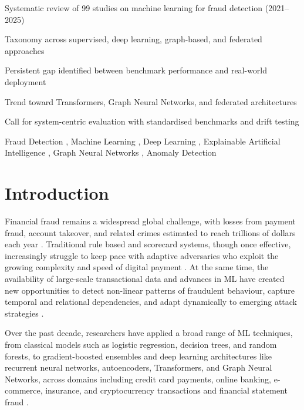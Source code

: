 \documentclass[a4paper,fleqn]{cas-dc}
\begin{document}
\begin{highlights}
\item Systematic review of 99 studies on machine learning for fraud detection (2021--2025)
\item Taxonomy across supervised, deep learning, graph-based, and federated approaches
\item Persistent gap identified between benchmark performance and real-world deployment
\item Trend toward Transformers, Graph Neural Networks, and federated architectures
\item Call for system-centric evaluation with standardised benchmarks and drift testing
\end{highlights}

\begin{keywords}
Fraud Detection \sep 
Machine Learning \sep
Deep Learning \sep
Explainable Artificial Intelligence \sep
Graph Neural Networks \sep
Anomaly Detection
\end{keywords}

\maketitle

\section{Introduction}
Financial fraud remains a widespread global challenge, with losses from payment fraud, account takeover, and related crimes estimated to reach trillions of dollars each year \cite{sarna_ai_2025, mill_opportunities_2023}. 
Traditional rule based and scorecard systems, though once effective, increasingly struggle to keep pace with adaptive adversaries who exploit the growing complexity and speed of digital payment \cite{banirostam_analysis_2024, madhavappa_efficient_2025}.
At the same time, the availability of large-scale transactional data and advances in ML have created new opportunities to detect non-linear patterns of fraudulent behaviour, capture temporal and relational dependencies, and adapt dynamically to emerging attack strategies \cite{deng_transformer-based_2025, kumar_revolutionising_2025}. 

Over the past decade, researchers have applied a broad range of ML techniques, from classical models such as logistic regression, decision trees, and random forests, to gradient-boosted ensembles and deep learning architectures like recurrent neural networks, autoencoders, Transformers, and Graph Neural Networks, across domains including credit card payments, online banking, e-commerce, insurance, and cryptocurrency transactions and financial statement fraud \cite{bin_sulaiman_review_2022, sarna_ai_2025, hashemi_fraud_2023, wang_temporal_2023, abadlia_enhanced_2025, abdullah_machine_2024, li_uncovering_2024, wei_evaluation_2023, wu_enhanced_2024}.
\end{document}
